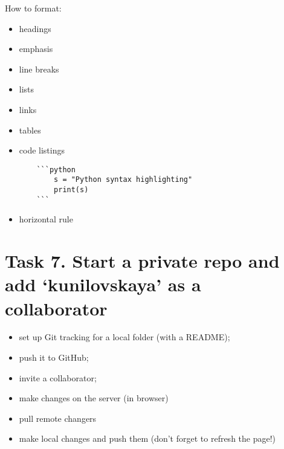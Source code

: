 \documentclass[a4paper,11pt]{article}
\begin{document}
How to format:
\begin{itemize}
	\item headings
	\item emphasis
	\item line breaks
	\item lists
	\item links
	\item tables
	\item code listings\\
	\begin{lstlisting}
	```python
		s = "Python syntax highlighting"
		print(s)
	```
	\end{lstlisting}
	\item horizontal rule
	
\end{itemize}

\section*{Task 7. Start a private repo and add `kunilovskaya' as a collaborator}
\label{task}

\begin{tcolorbox}[width=\textwidth, colback={yellow!40!white}, title={}, colbacktitle=yellow!60!white, coltitle=black]
	\begin{itemize}
		\item set up Git tracking for a local folder (with a README);
		\item push it to GitHub;  
		\item invite a collaborator;
		\item make changes on the server (in browser)
		\item pull remote changers
		\item make local changes and push them (don't forget to refresh the page!)
	\end{itemize}
	
\end{tcolorbox}%
\end{document}

